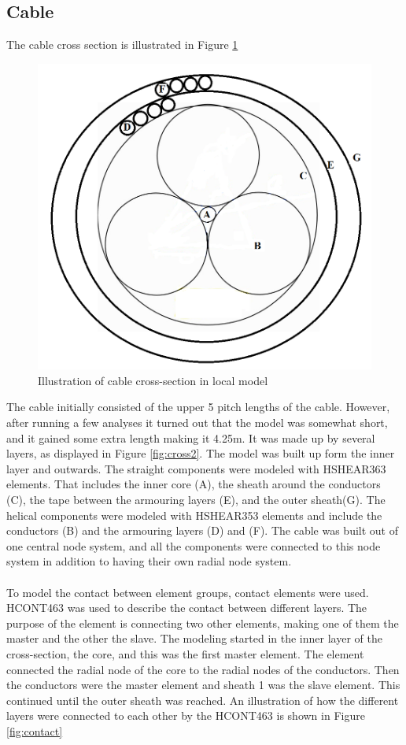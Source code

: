 \subsection{Cable}
The cable cross section is illustrated in Figure \ref{fig:crosspro}
\begin{figure}[H]
\centering
\includegraphics[scale=0.5]{figures/cross2}
\caption [$\; \:$ Cable cross-section in local model]{Illustration of cable cross-section in local model}
 \label{fig:crosspro}
\end{figure}
\noindent The cable initially consisted of the upper 5 pitch lengths of the cable. However, after running a few analyses it turned out that the model was somewhat short, and it gained some extra length making it 4.25m. It was made up by several layers, as displayed in Figure \ref{fig:cross2}. The model was built up form the inner layer and outwards. 
The straight components were modeled with HSHEAR363 elements. That includes the inner core (A), the sheath around the conductors (C), the tape between the armouring layers (E), and the outer sheath(G). The helical components were modeled with HSHEAR353 elements and include the conductors (B) and the armouring layers (D) and (F). The cable was built out of one central node system, and all the components were connected to this node system in addition to having their own radial node system.\\\\ To model the contact between element groups, contact elements were used.  HCONT463 was used to describe the contact between different layers. The purpose of the element is connecting two other elements, making one of them the master and the other the slave. The modeling started in the inner layer of the cross-section, the core, and this was the first master element. The element connected the radial node of the core to the radial nodes of the conductors. Then the conductors were the master element and sheath 1 was the slave element. This continued until the outer sheath was reached. An illustration of how the different layers were connected to each other by the HCONT463 is shown in Figure \ref{fig:contact}


